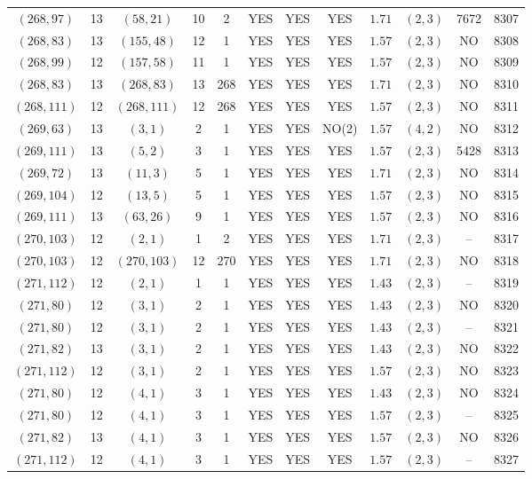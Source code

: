 \begin{longtable}{|c|c|c|c|c|c|c|c|c|c|c|c|}
$(268,97)$ & 13 & $(58,21)$ & 10 & 2 & YES & YES & YES & $1.71$ & $(2,3)$ & 7672 & 8307\\
$(268,83)$ & 13 & $(155,48)$ & 12 & 1 & YES & YES & YES & $1.57$ & $(2,3)$ & NO & 8308\\
$(268,99)$ & 12 & $(157,58)$ & 11 & 1 & YES & YES & YES & $1.57$ & $(2,3)$ & NO & 8309\\
$(268,83)$ & 13 & $(268,83)$ & 13 & 268 & YES & YES & YES & $1.71$ & $(2,3)$ & NO & 8310\\
$(268,111)$ & 12 & $(268,111)$ & 12 & 268 & YES & YES & YES & $1.57$ & $(2,3)$ & NO & 8311\\
$(269,63)$ & 13 & $(3,1)$ & 2 & 1 & YES & YES & NO(2) & $1.57$ & $(4,2)$ & NO & 8312\\
$(269,111)$ & 13 & $(5,2)$ & 3 & 1 & YES & YES & YES & $1.57$ & $(2,3)$ & 5428 & 8313\\
$(269,72)$ & 13 & $(11,3)$ & 5 & 1 & YES & YES & YES & $1.71$ & $(2,3)$ & NO & 8314\\
$(269,104)$ & 12 & $(13,5)$ & 5 & 1 & YES & YES & YES & $1.57$ & $(2,3)$ & NO & 8315\\
$(269,111)$ & 13 & $(63,26)$ & 9 & 1 & YES & YES & YES & $1.57$ & $(2,3)$ & NO & 8316\\
$(270,103)$ & 12 & $(2,1)$ & 1 & 2 & YES & YES & YES & $1.71$ & $(2,3)$ & -- & 8317\\
$(270,103)$ & 12 & $(270,103)$ & 12 & 270 & YES & YES & YES & $1.71$ & $(2,3)$ & NO & 8318\\
$(271,112)$ & 12 & $(2,1)$ & 1 & 1 & YES & YES & YES & $1.43$ & $(2,3)$ & -- & 8319\\
$(271,80)$ & 12 & $(3,1)$ & 2 & 1 & YES & YES & YES & $1.43$ & $(2,3)$ & NO & 8320\\
$(271,80)$ & 12 & $(3,1)$ & 2 & 1 & YES & YES & YES & $1.43$ & $(2,3)$ & -- & 8321\\
$(271,82)$ & 13 & $(3,1)$ & 2 & 1 & YES & YES & YES & $1.43$ & $(2,3)$ & NO & 8322\\
$(271,112)$ & 12 & $(3,1)$ & 2 & 1 & YES & YES & YES & $1.57$ & $(2,3)$ & NO & 8323\\
$(271,80)$ & 12 & $(4,1)$ & 3 & 1 & YES & YES & YES & $1.43$ & $(2,3)$ & NO & 8324\\
$(271,80)$ & 12 & $(4,1)$ & 3 & 1 & YES & YES & YES & $1.57$ & $(2,3)$ & -- & 8325\\
$(271,82)$ & 13 & $(4,1)$ & 3 & 1 & YES & YES & YES & $1.57$ & $(2,3)$ & NO & 8326\\
$(271,112)$ & 12 & $(4,1)$ & 3 & 1 & YES & YES & YES & $1.57$ & $(2,3)$ & -- & 8327\\

\end{longtable}
